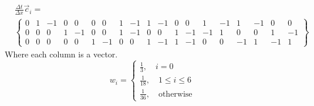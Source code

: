 \documentclass[a4paper,12pt]{scrartcl}
\begin{document}
	\begin{equation}\label{eq:D3Q19c}
		\begin{split}
			&\frac{\Delta t}{\Delta x}\vec{c}_i = \\
			&\begin{Bmatrix}
				0 & 1 & -1 & 0 & 0 & 0 & 0 & 1 & -1 & 1 & -1 & 0 & 0 & 1 & -1 & 1 & -1 & 0 & 0 \\
				0 & 0 & 0 & 1 & -1 & 0 & 0 & 1 & -1 & 0 & 0 & 1 & -1 & -1 & 1 & 0 & 0 & 1 & -1 \\
				0 & 0 & 0 & 0 & 0 & 1 & -1 & 0 & 0 & 1 & -1 & 1 & -1 & 0 & 0 & -1 & 1 & -1 & 1
			\end{Bmatrix}
		\end{split}
	\end{equation}
	Where each column is a vector.
	\begin{equation}\label{eq:D3Q19w}
		w_i = \begin{cases}
			\frac{1}{3},\quad i=0\\
			\frac{1}{18},\quad 1 \leq i \leq 6\\
			\frac{1}{36},\quad \text{otherwise}
		\end{cases}
	\end{equation}
\end{document}
